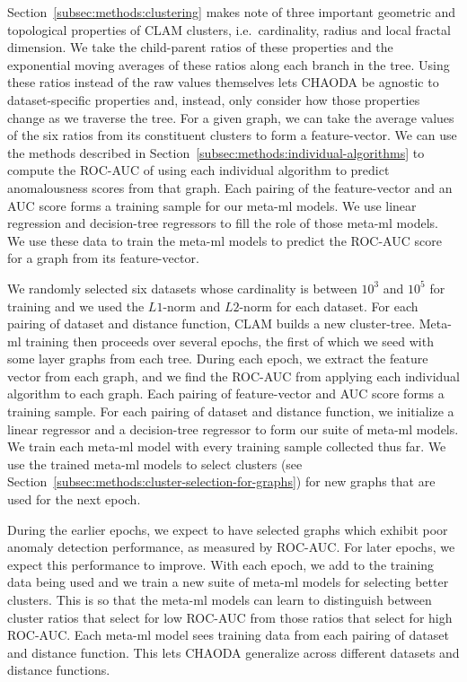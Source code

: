Section~\ref{subsec:methods:clustering} makes note of three important geometric and topological properties of CLAM clusters, i.e.\ cardinality, radius and local fractal dimension.
We take the child-parent ratios of these properties and the exponential moving averages of these ratios along each branch in the tree.
Using these ratios instead of the raw values themselves lets CHAODA be agnostic to dataset-specific properties and, instead, only consider how those properties change as we traverse the tree.
For a given graph, we can take the average values of the six ratios from its constituent clusters to form a feature-vector.
We can use the methods described in Section~\ref{subsec:methods:individual-algorithms} to compute the ROC-AUC of using each individual algorithm to predict anomalousness scores from that graph.
Each pairing of the feature-vector and an AUC score forms a training sample for our meta-ml models.
We use linear regression and decision-tree regressors to fill the role of those meta-ml models.
We use these data to train the meta-ml models to predict the ROC-AUC score for a graph from its feature-vector.

We randomly selected six datasets whose cardinality is between $10^3$ and $10^5$ for training and we used the $L1$-norm and $L2$-norm for each dataset.
For each pairing of dataset and distance function, CLAM builds a new cluster-tree.
Meta-ml training then proceeds over several epochs, the first of which we seed with some layer graphs from each tree.
During each epoch, we extract the feature vector from each graph, and we find the ROC-AUC from applying each individual algorithm to each graph.
Each pairing of feature-vector and AUC score forms a training sample.
For each pairing of dataset and distance function, we initialize a linear regressor and a decision-tree regressor to form our suite of meta-ml models.
We train each meta-ml model with every training sample collected thus far.
We use the trained meta-ml models to select clusters (see Section~\ref{subsec:methods:cluster-selection-for-graphs}) for new graphs that are used for the next epoch.

During the earlier epochs, we expect to have selected graphs which exhibit poor anomaly detection performance, as measured by ROC-AUC.
For later epochs, we expect this performance to improve.
With each epoch, we add to the training data being used and we train a new suite of meta-ml models for selecting better clusters.
This is so that the meta-ml models can learn to distinguish between cluster ratios that select for low ROC-AUC from those ratios that select for high ROC-AUC.
Each meta-ml model sees training data from each pairing of dataset and distance function.
This lets CHAODA generalize across different datasets and distance functions.


